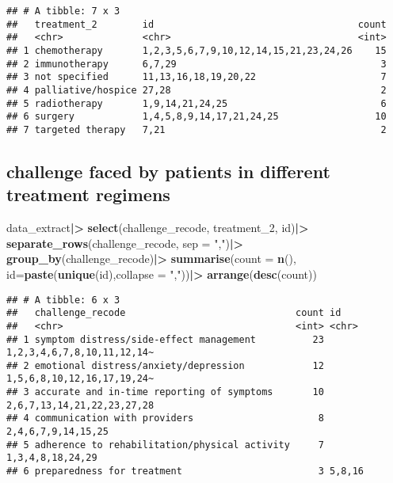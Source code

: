 \documentclass[
]{article}
\newenvironment{Shaded}{\begin{snugshade}}{\end{snugshade}}
\newcommand{\AttributeTok}[1]{\textcolor[rgb]{0.13,0.29,0.53}{#1}}
\newcommand{\FunctionTok}[1]{\textcolor[rgb]{0.13,0.29,0.53}{\textbf{#1}}}
\newcommand{\NormalTok}[1]{#1}
\newcommand{\SpecialCharTok}[1]{\textcolor[rgb]{0.81,0.36,0.00}{\textbf{#1}}}
\newcommand{\StringTok}[1]{\textcolor[rgb]{0.31,0.60,0.02}{#1}}
\begin{document}
\begin{verbatim}
## # A tibble: 7 x 3
##   treatment_2        id                                    count
##   <chr>              <chr>                                 <int>
## 1 chemotherapy       1,2,3,5,6,7,9,10,12,14,15,21,23,24,26    15
## 2 immunotherapy      6,7,29                                    3
## 3 not specified      11,13,16,18,19,20,22                      7
## 4 palliative/hospice 27,28                                     2
## 5 radiotherapy       1,9,14,21,24,25                           6
## 6 surgery            1,4,5,8,9,14,17,21,24,25                 10
## 7 targeted therapy   7,21                                      2
\end{verbatim}

\subsection{challenge faced by patients in different treatment
regimens}\label{challenge-faced-by-patients-in-different-treatment-regimens}

\begin{Shaded}
\begin{Highlighting}[]
\NormalTok{data\_extract}\SpecialCharTok{|\textgreater{}}
  \FunctionTok{select}\NormalTok{(challenge\_recode, treatment\_2, id)}\SpecialCharTok{|\textgreater{}}
  \FunctionTok{separate\_rows}\NormalTok{(challenge\_recode, }\AttributeTok{sep =} \StringTok{","}\NormalTok{)}\SpecialCharTok{|\textgreater{}}
  \FunctionTok{group\_by}\NormalTok{(challenge\_recode)}\SpecialCharTok{|\textgreater{}}
  \FunctionTok{summarise}\NormalTok{(}\AttributeTok{count =} \FunctionTok{n}\NormalTok{(),}
            \AttributeTok{id=}\FunctionTok{paste}\NormalTok{(}\FunctionTok{unique}\NormalTok{(id),}\AttributeTok{collapse =} \StringTok{","}\NormalTok{))}\SpecialCharTok{|\textgreater{}}
  \FunctionTok{arrange}\NormalTok{(}\FunctionTok{desc}\NormalTok{(count))}
\end{Highlighting}
\end{Shaded}

\begin{verbatim}
## # A tibble: 6 x 3
##   challenge_recode                              count id                        
##   <chr>                                         <int> <chr>                     
## 1 symptom distress/side-effect management          23 1,2,3,4,6,7,8,10,11,12,14~
## 2 emotional distress/anxiety/depression            12 1,5,6,8,10,12,16,17,19,24~
## 3 accurate and in-time reporting of symptoms       10 2,6,7,13,14,21,22,23,27,28
## 4 communication with providers                      8 2,4,6,7,9,14,15,25        
## 5 adherence to rehabilitation/physical activity     7 1,3,4,8,18,24,29          
## 6 preparedness for treatment                        3 5,8,16
\end{verbatim}
\end{document}
